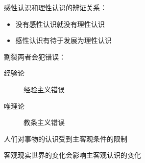 \begin{notation}
    感性认识和理性认识的辨证关系：
    \begin{itemize}
        \item 没有感性认识就没有理性认识
        \item 感性认识有待于发展为理性认识
    \end{itemize}

    割裂两者会犯错误：
    \begin{description}
        \item[经验论] 经验主义错误
        \item[唯理论] 教条主义错误
    \end{description}
\end{notation}
\begin{notation}
    人们对事物的认识受到主客观条件的限制

    客观现实世界的变化会影响主客观认识的变化
\end{notation}


